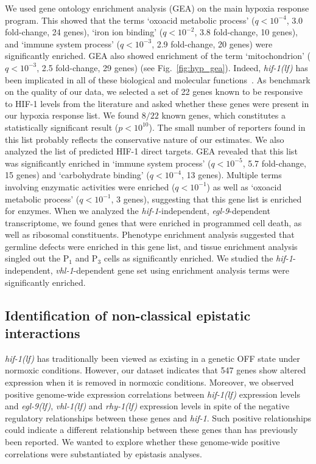 \documentclass[9pt,twocolumn,twoside]{pnas-new}
\newcommand{\qval}[1]{$q<10^{-#1}$}
\newcommand{\gene}[1]{\emph{#1}}
\newcommand{\egl}{\emph{egl-9(lf)}}
\newcommand{\rhy}{\emph{rhy-1(lf)}}
\newcommand{\vhl}{\emph{vhl-1(lf)}}
\newcommand{\hif}{\emph{hif-1(lf)}}
\newcommand{\hifp}{HIF-1}
\newcommand{\hifn}{547}
\begin{document}
We used gene ontology enrichment analysis (GEA) on the main hypoxia response program.
This showed that the terms `oxoacid metabolic process' (\qval{4}, 3.0 fold-change,
24 genes), `iron ion binding' (\qval{2}, 3.8 fold-change, 10 genes), and `immune
system process' (\qval{3}, 2.9 fold-change, 20 genes) were significantly enriched.
GEA also showed enrichment of the term `mitochondrion' (\qval{3}, 2.5 fold-change,
29 genes) (see Fig.~\ref{fig:hyp_gea}). Indeed, \hif{} has been implicated in
all of these biological and molecular functions~\cite{Luhachack2012,Ackerman2012,
Romney2011,Semenza2011}.
As benchmark on the quality of our data, we selected a set of 22 genes known to
be responsive to \hifp{} levels from the literature and asked whether these genes
were present in our hypoxia response list. We found $8/22$ known genes, which
constitutes a statistically significant result ($p<10^{10}$). The small number of
reporters found in this list probably reflects the conservative nature of our
estimates.
We also analyzed the list of predicted \hifp{} direct targets. GEA revealed that
this list was significantly enriched in `immune system process' (\qval{5}, 5.7
fold-change, 15 genes) and `carbohydrate binding' (\qval{4}, 13 genes). Multiple
terms involving enzymatic activities were enriched (\qval{1}) as well as
`oxoacid metabolic process' (\qval{1}, 3 genes), suggesting that this gene list
is enriched for enzymes.
When we analyzed the \gene{hif-1}-independent, \gene{egl-9}-dependent transcriptome,
we found genes that were enriched in programmed cell death, as well as ribosomal
constituents. Phenotype enrichment analysis suggested that germline defects were
enriched in this gene list, and tissue enrichment analysis singled out the P$_1$
and P$_3$ cells as significantly enriched.
We studied the \gene{hif-1}-independent, \gene{vhl-1}-dependent gene set
using enrichment analysis terms were significantly enriched.

\subsection{Identification of non-classical epistatic interactions}
\label{sub:hifoh}
\hif{} has traditionally been viewed as existing in a genetic OFF state under
normoxic conditions. However, our dataset indicates that \hifn{} genes show
altered expression when it is removed in normoxic conditions. Moreover, we
observed positive genome-wide expression correlations between \hif{} expression
levels and \egl{}, \vhl{} and \rhy{} expression levels in spite of the negative
regulatory relationships between these genes and \gene{hif-1}. Such positive
relationships could indicate a different relationship between these genes
than has previously been reported. We wanted to explore whether these genome-wide
positive correlations were substantiated by epistasis analyses.
\end{document}
